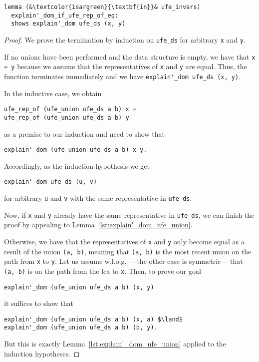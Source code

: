 \documentclass[
  sigplan,
  10pt,
  anonymous,
  review,
  ]{acmart}
\begin{document}
\begin{lstlisting}
lemma (&\textcolor{isargreen}{\textbf{in}}& ufe_invars)
  explain'_dom_if_ufe_rep_of_eq:
  shows explain'_dom ufe_ds (x, y)
\end{lstlisting}
\begin{proof}
  We prove the termination by induction on \lstinline|ufe_ds| for arbitrary \lstinline|x| and \lstinline|y|.

  If no unions have been performed and the data structure is empty, we have that \lstinline|x = y| because we assume that the representatives of \lstinline|x| and \lstinline|y| are equal.
  Thus, the function terminates immediately and we have \lstinline|explain'_dom ufe_ds (x, y)|.

  In the inductive case, we obtain
  \begin{lstlisting}
ufe_rep_of (ufe_union ufe_ds a b) x =
ufe_rep_of (ufe_union ufe_ds a b) y
  \end{lstlisting}
  as a premise to our induction and need to show that
  \begin{lstlisting}
explain'_dom (ufe_union ufe_ds a b) x y.
  \end{lstlisting}
  Accordingly, as the induction hypothesis we get
  \begin{lstlisting}
explain'_dom ufe_ds (u, v)
  \end{lstlisting}
  for arbitrary \lstinline|u| and \lstinline|v| with the same representative in \lstinline|ufe_ds|.

  Now, if \lstinline|x| and \lstinline|y| already have the same representative in \lstinline|ufe_ds|, we can finish the proof by appealing to Lemma~\ref{lst:explain'_dom_ufe_union}.

  Otherwise, we have that the representatives of \lstinline|x| and \lstinline|y| only become equal as a result of the union \lstinline|(a, b)|,
  meaning that \lstinline|(a, b)| is the most recent union on the path from \lstinline|x| to \lstinline|y|.
  Let us assume w.l.o.g.\ ---the other case is symmetric--- that \lstinline|(a, b)| is on the path from the \acrshort{lca} to \lstinline|x|.
  Then, to prove our goal
  \begin{lstlisting}
explain'_dom (ufe_union ufe_ds a b) (x, y)
  \end{lstlisting}
  it suffices to show that
  \begin{lstlisting}
explain'_dom (ufe_union ufe_ds a b) (x, a) $\land$
explain'_dom (ufe_union ufe_ds a b) (b, y).
  \end{lstlisting}
  But this is exactly Lemma~\ref{lst:explain'_dom_ufe_union} applied to the induction hypotheses.
\end{proof}
\end{document}
